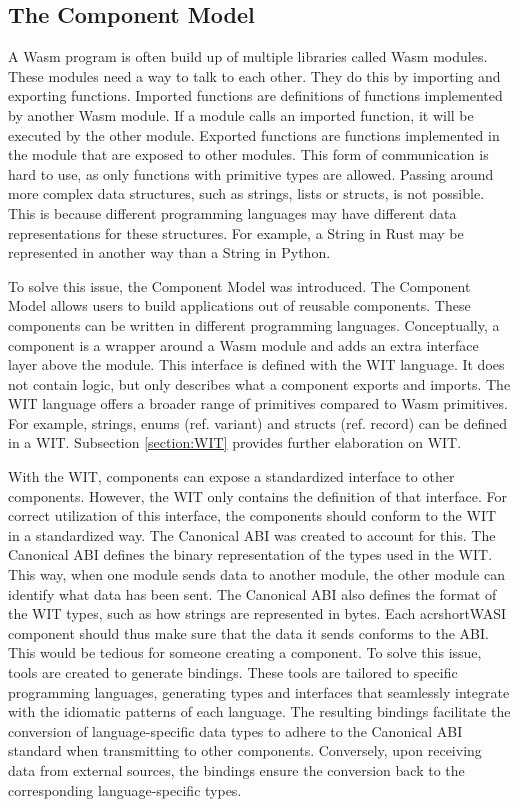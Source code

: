 \subsection{The Component Model}
\label{section:thecomponentmodel}

A \acrshort{Wasm} program is often build up of multiple libraries called Wasm modules. These modules need a way to talk to each other. They do this by importing and exporting functions. Imported functions are definitions of functions implemented by another Wasm module. If a module calls an imported function, it will be executed by the other module. Exported functions are functions implemented in the module that are exposed to other modules. 
This form of communication is hard to use, as only functions with primitive types are allowed. Passing around more complex data structures, such as strings, lists or structs, is not possible. This is because different programming languages may have different data representations for these structures. For example, a String in Rust may be represented in another way than a String in Python.

To solve this issue, the Component Model was introduced. The Component Model allows users to build applications out of reusable components. These components can be written in different programming languages. Conceptually, a component is a wrapper around a \acrshort{Wasm} module and adds an extra interface layer above the module. This interface is defined with the \acrshort{WIT} language. It does not contain logic, but only describes what a component exports and imports. The \acrshort{WIT} language offers a broader range of primitives compared to \acrshort{Wasm} primitives. For example, strings, enums (ref. variant) and structs (ref. record) can be defined in a \acrshort{WIT}. Subsection \ref{section:WIT} provides further elaboration on WIT.

With the \acrshort{WIT}, components can expose a standardized interface to other components. However, the \acrshort{WIT} only contains the definition of that interface. For correct utilization of this interface, the components should conform to the \acrshort{WIT} in a standardized way. The Canonical \acrshort{ABI} was created to account for this. The Canonical \acrshort{ABI} defines the binary representation of the types used in the \acrshort{WIT}. This way, when one module sends data to another module, the other module can identify what data has been sent. The Canonical \acrshort{ABI} also defines the format of the \acrshort{WIT} types, such as how strings are represented in bytes. Each acrshort{WASI} component should thus make sure that the data it sends conforms to the ABI. This would be tedious for someone creating a component. To solve this issue, tools are created to generate bindings. These tools are tailored to specific programming languages, generating types and interfaces that seamlessly integrate with the idiomatic patterns of each language. The resulting bindings facilitate the conversion of language-specific data types to adhere to the Canonical ABI standard when transmitting to other components. Conversely, upon receiving data from external sources, the bindings ensure the conversion back to the corresponding language-specific types.


